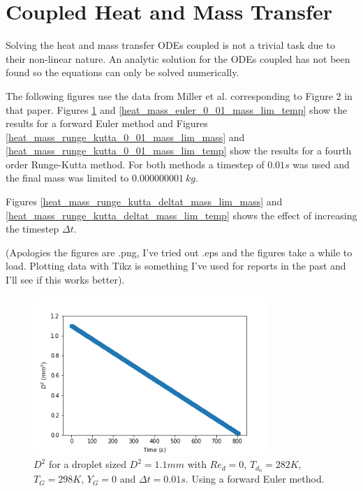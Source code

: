 \documentclass[]{article}
\begin{document}
\section{Coupled Heat and Mass Transfer}
Solving the heat and mass transfer ODEs coupled is not a trivial task due to their non-linear nature. An analytic solution for the ODEs coupled has not been found so the equations can only be solved numerically. 

The following figures use the data from Miller et al. corresponding to Figure 2 in that paper. Figures \ref{heat_mass_euler_0_01_mass_lim_mass} and \ref{heat_mass_euler_0_01_mass_lim_temp} show the results for a forward Euler method and Figures \ref{heat_mass_runge_kutta_0_01_mass_lim_mass} and \ref{heat_mass_runge_kutta_0_01_mass_lim_temp} show the results for a fourth order Runge-Kutta method. For both methods a timestep of $0.01s$ was used and the final mass was limited to $0.000000001~kg$.

Figures \ref{heat_mass_runge_kutta_deltat_mass_lim_mass} and \ref{heat_mass_runge_kutta_deltat_mass_lim_temp} shows the effect of increasing the timestep  $\Delta t$.

(Apologies the figures are .png, I've tried out .eps and the figures take a while to load. Plotting data with Tikz is something I've used for reports in the past and I'll see if this works better). 

\begin{figure}[h]
	\centering
	\includegraphics[width=0.8\textwidth]{heat_mass_euler_0_01_mass_lim_mass}
	\caption{$D^2$ for a droplet sized $D^2=1.1mm$ with $Re_d=0$, $T_{d_0}=282K$, $T_G=298K$, $Y_G=0$ and $\Delta t=0.01s$. Using a forward Euler method.}
	\label{heat_mass_euler_0_01_mass_lim_mass}
\end{figure}
\end{document}
